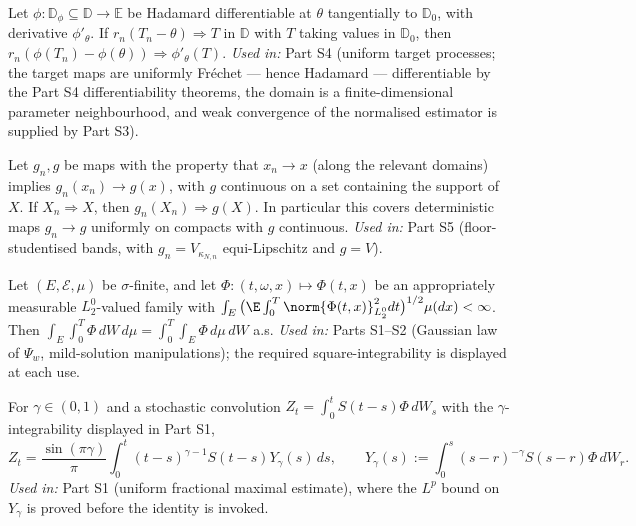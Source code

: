 \begin{proposition}\label{imp:delta}
Let $\phi:\mathbb D_\phi\subseteq\mathbb D\to\mathbb E$ be Hadamard
differentiable at $\theta$ tangentially to $\mathbb D_0$, with derivative
$\phi'_\theta$. If $r_n(T_n-\theta)\Rightarrow T$ in $\mathbb D$ with $T$
taking values in $\mathbb D_0$, then
$r_n(\phi(T_n)-\phi(\theta))\Rightarrow\phi'_\theta(T)$.
\emph{Used in:} Part S4 (uniform target processes; the target maps are
uniformly Fr\'echet — hence Hadamard — differentiable by the Part S4
differentiability theorems, the domain is a finite-dimensional parameter
neighbourhood, and weak convergence of the normalised estimator is supplied
by Part S3).
\end{proposition}

\begin{proposition}\label{imp:ecmt}
Let $g_n,g$ be maps with the property that $x_n\to x$ (along the relevant
domains) implies $g_n(x_n)\to g(x)$, with $g$ continuous on a set containing
the support of $X$. If $X_n\Rightarrow X$, then $g_n(X_n)\Rightarrow g(X)$.
In particular this covers deterministic maps $g_n\to g$ uniformly on
compacts with $g$ continuous.
\emph{Used in:} Part S5 (floor-studentised bands, with
$g_n=V_{\kappa_{N,n}}$ equi-Lipschitz and $g=V$).
\end{proposition}

\begin{proposition}\label{imp:fubini}
Let $(E,\mathcal E,\mu)$ be $\sigma$-finite, and let
$\Phi:(t,\omega,x)\mapsto\Phi(t,x)$ be an appropriately measurable
$L_2^0$-valued family with
$\int_E\big(\E\int_0^T\norm{\Phi(t,x)}_{L_2^0}^2dt\big)^{1/2}\mu(dx)<\infty$.
Then $\int_E\int_0^T\Phi\,dW\,d\mu=\int_0^T\int_E\Phi\,d\mu\,dW$ a.s.
\emph{Used in:} Parts S1--S2 (Gaussian law of $\Psi_w$, mild-solution
manipulations); the required square-integrability is displayed at each use.
\end{proposition}

\begin{proposition}\label{imp:factor}
For $\gamma\in(0,1)$ and a stochastic convolution
$Z_t=\int_0^tS(t-s)\Phi\,dW_s$ with the $\gamma$-integrability displayed in
Part S1,
\[
 Z_t=\frac{\sin(\pi\gamma)}{\pi}\int_0^t(t-s)^{\gamma-1}S(t-s)
 Y_\gamma(s)\,ds,
 \qquad
 Y_\gamma(s):=\int_0^s(s-r)^{-\gamma}S(s-r)\Phi\,dW_r .
\]
\emph{Used in:} Part S1 (uniform fractional maximal estimate), where the
$L^p$ bound on $Y_\gamma$ is proved before the identity is invoked.
\end{proposition}


